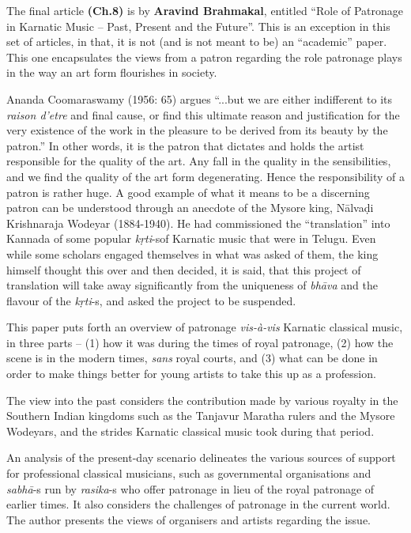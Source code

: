 The final article \textbf{(Ch.8)} is by \textbf{Aravind Brahmakal}, entitled “Role of Patronage in Karnatic Music – Past, Present and the Future”. This is an exception in this set of articles, in that, it is not (and is not meant to be) an “academic” paper. This one encapsulates the views from a patron regarding the role patronage plays in the way an art form flourishes in society.

\newpage

Ananda Coomaraswamy (1956: 65) argues “...but we are either indifferent to its \textit{raison d'etre} and final cause, or find this ultimate reason and justification for the very existence of the work in the pleasure to be derived from its beauty by the patron.” In other words, it is the patron that dictates and holds the artist responsible for the quality of the art. Any fall in the quality in the sensibilities, and we find the quality of the art form degenerating. Hence the responsibility of a patron is rather huge. A good example of what it means to be a discerning patron can be understood through an anecdote of the Mysore king, Nālvaḍi Krishnaraja Wodeyar (1884-1940). He had commissioned the “translation” into Kannada of some popular \textit{kṛti}-s\break of Karnatic music that were in Telugu. Even while some scholars engaged themselves in what was asked of them, the king himself thought this over and then decided, it is said, that this project of translation will take away significantly from the uniqueness of \textit{bhāva} and the flavour of the \textit{kṛti}-s, and asked the project to be suspended.

This paper puts forth an overview of patronage \textit{vis-à-vis} Karnatic classical music, in three parts – (1) how it was during the times of royal patronage, (2) how the scene is in the modern times, \textit{sans} royal courts, and (3) what can be done in order to make things better for young artists to take this up as a profession.

The view into the past considers the contribution made by various royalty in the Southern Indian kingdoms such as the Tanjavur Maratha rulers and the Mysore Wodeyars, and the strides Karnatic classical music took during that period.

An analysis of the present-day scenario delineates the various sources of support for professional classical musicians, such as governmental organisations and \textit{sabhā}-s run by \textit{rasika}-s who offer patronage in lieu of the royal patronage of earlier times. It also considers the challenges of patronage in the current world. The author presents the views of organisers and artists regarding the issue.

